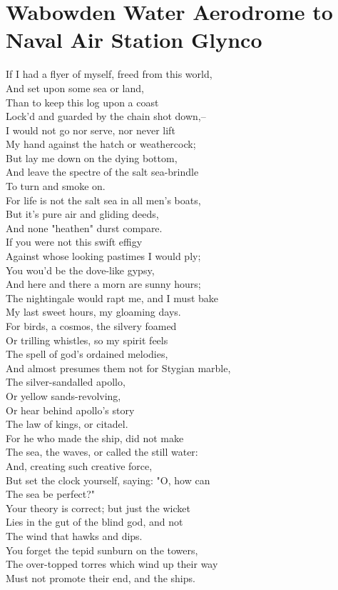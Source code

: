 \documentclass[smalldemyvopaper,11pt,twoside,onecolumn,openright,extrafontsizes]{memoir}
\begin{document}
\chapter{Wabowden Water Aerodrome to Naval Air Station Glynco}
If I had a flyer of myself, freed from this world,
\\And set upon some sea or land,
\\Than to keep this log upon a coast
\\Lock'd and guarded by the chain shot down,--
\\I would not go nor serve, nor never lift
\\My hand against the hatch or weathercock;
\\But lay me down on the dying bottom,
\\And leave the spectre of the salt sea-brindle
\\To turn and smoke on.
\\For life is not the salt sea in all men's boats,
\\But it's pure air and gliding deeds,
\\And none "heathen" durst compare.
\\If you were not this swift effigy
\\Against whose looking pastimes I would ply;
\\You wou'd be the dove-like gypsy,
\\And here and there a morn are sunny hours;
\\The nightingale would rapt me, and I must bake
\\My last sweet hours, my gloaming days.
\\For birds, a cosmos, the silvery foamed
\\Or trilling whistles, so my spirit feels
\\The spell of god's ordained melodies,
\\And almost presumes them not for Stygian marble,
\\The silver-sandalled apollo,
\\Or yellow sands-revolving,
\\Or hear behind apollo's story
\\The law of kings, or citadel.
\\For he who made the ship, did not make
\\The sea, the waves, or called the still water:
\\And, creating such creative force,
\\But set the clock yourself, saying: "O, how can
\\The sea be perfect?"
\\Your theory is correct; but just the wicket
\\Lies in the gut of the blind god, and not
\\The wind that hawks and dips.
\\You forget the tepid sunburn on the towers,
\\The over-topped torres which wind up their way
\\Must not promote their end, and the ships.
\end{document}
